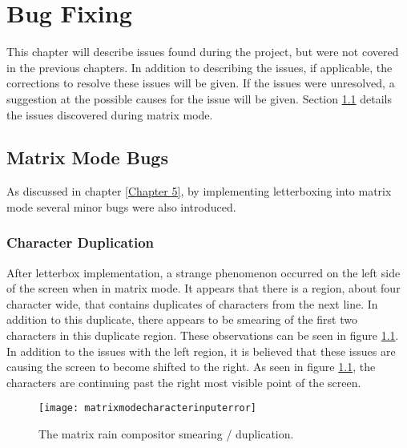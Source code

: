 
\chapter{Bug Fixing} %

\label{Chapter 7} %

This chapter will describe issues found during the project, but were not covered in the previous chapters. In addition to describing the issues, if applicable, the corrections to resolve these issues will be given. If the issues were unresolved, a suggestion at the possible causes for the issue will be given. Section \ref{Ch7 Sec1} details the issues discovered during matrix mode.


\section{Matrix Mode Bugs}

\label{Ch7 Sec1}

As discussed in chapter \ref{Chapter 5}, by implementing letterboxing into matrix mode several minor bugs were also introduced.


\subsection{Character Duplication}

\label{Ch7 Sec1 Sub1}

After letterbox implementation, a strange phenomenon occurred on the left side of the screen when in matrix mode. It appears that there is a region, about four character wide, that contains duplicates of characters from the next line. In addition to this duplicate, there appears to be smearing of the first two characters in this duplicate region. These observations can be seen in figure \ref{fig:matrixmodecharacterinputerror}. In addition to the issues with the left region, it is believed that these issues are causing the screen to become shifted to the right. As seen in figure \ref{fig:matrixmodecharacterinputerror}, the characters are continuing past the right most visible point of the screen. 

\begin{figure}
  \centering
  \texttt{[image: matrixmodecharacterinputerror]}
  \caption{The matrix rain compositor smearing / duplication.}
  \label{fig:matrixmodecharacterinputerror}
\end{figure}

